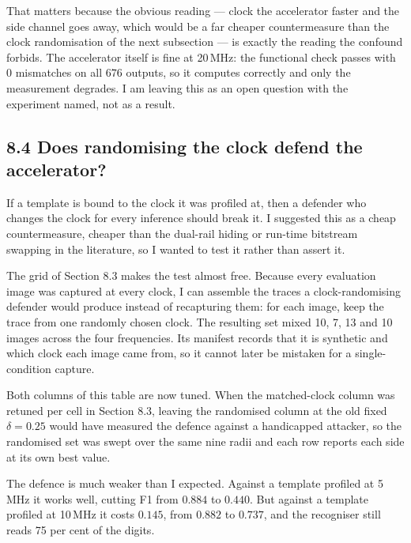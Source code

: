 \documentclass[11pt,a4paper]{article}
\begin{document}
That matters because the obvious reading --- clock the accelerator faster and the side
channel goes away, which would be a far cheaper countermeasure than the clock randomisation
of the next subsection --- is exactly the reading the confound forbids. The accelerator
itself is fine at 20\,MHz: the functional check passes with $0$ mismatches on all $676$
outputs, so it computes correctly and only the measurement degrades. I am leaving this as an
open question with the experiment named, not as a result.

\subsection*{8.4 Does randomising the clock defend the accelerator?}

If a template is bound to the clock it was profiled at, then a defender who changes the
clock for every inference should break it. I suggested this as a cheap countermeasure,
cheaper than the dual-rail hiding or run-time bitstream swapping in the literature, so I
wanted to test it rather than assert it.

The grid of Section 8.3 makes the test almost free. Because every evaluation image was
captured at every clock, I can assemble the traces a clock-randomising defender would
produce instead of recapturing them: for each image, keep the trace from one randomly
chosen clock. The resulting set mixed 10, 7, 13 and 10 images across the four frequencies.
Its manifest records that it is synthetic and which clock each image came from, so it
cannot later be mistaken for a single-condition capture.

\begin{table}[h]
  \centering
  \small
  
  \caption{What clock randomisation costs each template, compared with that template
  attacking its own matched clock.}
  \label{tab:jitter}
\end{table}

Both columns of this table are now tuned. When the matched-clock column was retuned per
cell in Section 8.3, leaving the randomised column at the old fixed $\delta = 0.25$ would
have measured the defence against a handicapped attacker, so the randomised set was swept
over the same nine radii and each row reports each side at its own best value.

The defence is much weaker than I expected. Against a template profiled at 5\,MHz it works
well, cutting F1 from $0.884$ to $0.440$. But against a template profiled at 10\,MHz it
costs $0.145$, from $0.882$ to $0.737$, and the recogniser still reads 75 per cent of the
digits.
\end{document}
